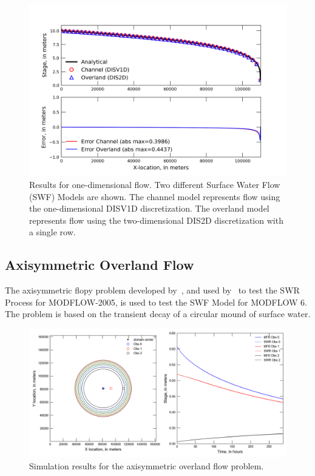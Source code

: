 \documentclass[fleqn]{article}
\begin{document}
\begin{figure}[h!tbp]
	\centering
	\includegraphics[scale=1.0]{figures/oned.png}
	\caption[Results for one-dimensional flow.]{Results for one-dimensional flow.  Two different Surface Water Flow (SWF) Models are shown.  The channel model represents flow using the one-dimensional DISV1D discretization.  The overland model represents flow using the two-dimensional DIS2D discretization with a single row.}
	\label{fig:oned-results}
\end{figure}


\subsection{Axisymmetric Overland Flow}

The axisymmetric flopy problem developed by~\cite{lal2001}, and used by~\cite{hughes2015} to test the SWR Process for MODFLOW-2005, is used to test the SWF Model for MODFLOW 6.  The problem is based on the transient decay of a circular mound of surface water.

\begin{figure}[h!tbp]
	\centering
	\includegraphics[scale=0.70]{figures/axi-results.png}
	\caption[Simulation results for the axisymmetric overland flow problem.]{Simulation results for the axisymmetric overland flow problem.}
	\label{fig:axi-results}
\end{figure}
\end{document}
